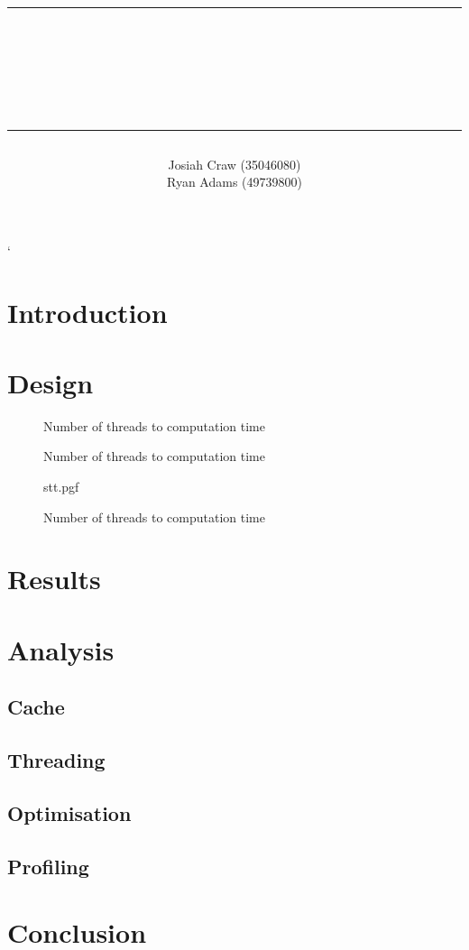 `\documentclass[12pt]{article}
\author{\LARGE Josiah Craw (35046080)\vspace{1cm}\\\LARGE Ryan Adams (49739800)\vspace{1cm}\\}
\title{\rule{\textwidth}{0.8pt} \\ {\huge \textbf{\reportTitle}}\\{\large \subTitle} \rule{\textwidth}{0.8pt}}
\begin{document}
\maketitle
\thispagestyle{empty}
\newpage

\setcounter{page}{1}
\section{Introduction}

\section{Design}

\begin{figure}[H]
    \centering
    
    \caption{Number of threads to computation time}
\end{figure}

\begin{figure}[H]
    \centering
    
    \caption{Number of threads to computation time}
\end{figure}

\begin{figure}[H]
    \centering
    {stt.pgf}
    \caption{Number of threads to computation time}
\end{figure}

\section{Results}

\section{Analysis}

\subsection{Cache}

\subsection{Threading}

\subsection{Optimisation}

\subsection{Profiling}

\section{Conclusion}

\newpage
\medskip


\end{document}
